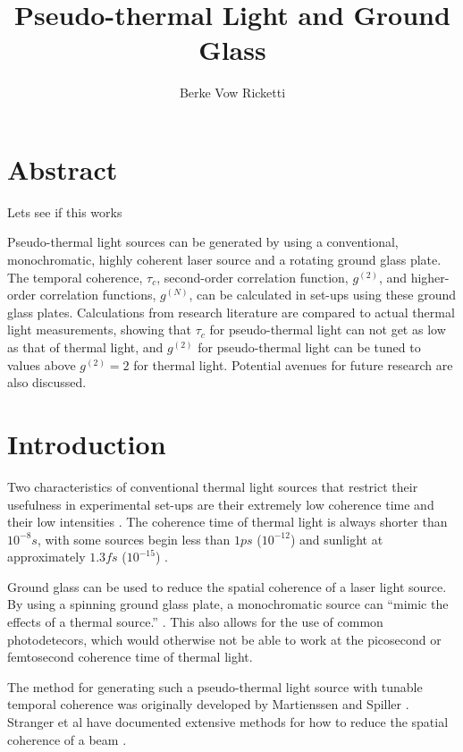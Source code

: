 \documentclass{article}
\title{Pseudo-thermal Light and Ground Glass}
\author{Berke Vow Ricketti}
\begin{document}
\maketitle{}





\section{Abstract}

Lets see if this works

Pseudo-thermal light sources can be generated by using a conventional, monochromatic, highly coherent laser source and a rotating ground glass plate. The temporal coherence, $\tau_{c}$, second-order correlation function, $g^{(2)}$, and higher-order correlation functions, $g^{(N)}$, can be calculated in set-ups using these ground glass plates. Calculations from research literature are compared to actual thermal light measurements, showing that $\tau_{c}$ for pseudo-thermal light can not get as low as that of thermal light, and $g^{(2)}$ for pseudo-thermal light can be tuned to values above $g^{(2)} = 2$ for thermal light. Potential avenues for future research are also discussed.

\section{Introduction}

Two characteristics of conventional thermal light sources that restrict their
usefulness in experimental set-ups are their extremely low coherence time and
their low intensities \cite{Spiller2014}. The coherence time of thermal light is
always shorter than $10^{-8}s$, with some sources begin less than $1 ps$ ($10^{-12}$)
and sunlight at approximately $1.3fs$ ($10^{-15}$) \cite{Spiller2014,Deutsch}.

Ground glass can be used to reduce the spatial coherence of a laser light source. By using a spinning ground glass plate, a monochromatic source can ``mimic the effects of a thermal source.'' \cite{Grider1996}. This also allows for the use of common photodetecors, which would otherwise not be able to work at the picosecond or femtosecond coherence time of thermal light.

The method for generating such a pseudo-thermal light source with tunable
temporal coherence was originally developed by Martienssen and Spiller \cite{Spiller2014}. Stranger et al have documented extensive methods for how to reduce the spatial coherence of a beam \cite{Ndersson2017}.
\end{document}
